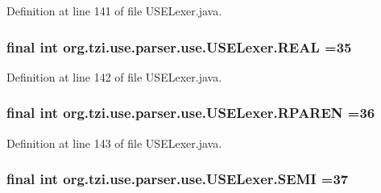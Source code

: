 Definition at line 141 of file U\-S\-E\-Lexer.\-java.

\hypertarget{classorg_1_1tzi_1_1use_1_1parser_1_1use_1_1_u_s_e_lexer_a28214e8c84dea44f5cb5114b7c80a7ed}{
\subsubsection[{R\-E\-A\-L}]{\setlength{\rightskip}{0pt plus 5cm}final int org.\-tzi.\-use.\-parser.\-use.\-U\-S\-E\-Lexer.\-R\-E\-A\-L =35\hspace{0.3cm}{\ttfamily [static]}}}\label{classorg_1_1tzi_1_1use_1_1parser_1_1use_1_1_u_s_e_lexer_a28214e8c84dea44f5cb5114b7c80a7ed}


Definition at line 142 of file U\-S\-E\-Lexer.\-java.

\hypertarget{classorg_1_1tzi_1_1use_1_1parser_1_1use_1_1_u_s_e_lexer_a24a60355207717b2a323da28ff57496b}{
\subsubsection[{R\-P\-A\-R\-E\-N}]{\setlength{\rightskip}{0pt plus 5cm}final int org.\-tzi.\-use.\-parser.\-use.\-U\-S\-E\-Lexer.\-R\-P\-A\-R\-E\-N =36\hspace{0.3cm}{\ttfamily [static]}}}\label{classorg_1_1tzi_1_1use_1_1parser_1_1use_1_1_u_s_e_lexer_a24a60355207717b2a323da28ff57496b}


Definition at line 143 of file U\-S\-E\-Lexer.\-java.

\hypertarget{classorg_1_1tzi_1_1use_1_1parser_1_1use_1_1_u_s_e_lexer_a3a6a2a0cbeacf98ce71b66943d3f4484}{
\subsubsection[{S\-E\-M\-I}]{\setlength{\rightskip}{0pt plus 5cm}final int org.\-tzi.\-use.\-parser.\-use.\-U\-S\-E\-Lexer.\-S\-E\-M\-I =37\hspace{0.3cm}{\ttfamily [static]}}}\label{classorg_1_1tzi_1_1use_1_1parser_1_1use_1_1_u_s_e_lexer_a3a6a2a0cbeacf98ce71b66943d3f4484}


